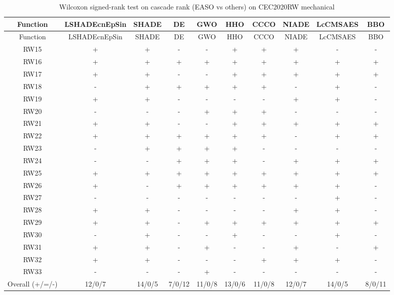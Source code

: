 \begin{center}
\small
\renewcommand{\arraystretch}{1.25}
\begin{longtable}{cccccccccc}
\caption{Wilcoxon signed-rank test on cascade rank (EASO vs others) on CEC2020RW  mechanical}
\label{tab:wilcoxon_cascade_CEC2020RW_mechanical} \\
\toprule
Function & LSHADEcnEpSin & SHADE & DE & GWO & HHO & CCCO & NIADE & LcCMSAES & BBO \\
\midrule
\endfirsthead
\toprule
Function & LSHADEcnEpSin & SHADE & DE & GWO & HHO & CCCO & NIADE & LcCMSAES & BBO \\
\midrule
\endhead
RW15 & + & + & - & - & + & + & + & - & - \\
RW16 & + & + & + & + & + & + & + & + & + \\
RW17 & + & + & - & - & + & + & + & + & + \\
RW18 & - & + & + & + & + & + & - & + & - \\
RW19 & + & + & - & - & - & - & + & + & - \\
RW20 & - & - & - & + & + & + & - & - & - \\
RW21 & + & + & - & - & + & + & + & + & + \\
RW22 & + & + & + & + & + & + & - & + & + \\
RW23 & - & + & + & + & + & - & - & - & - \\
RW24 & - & - & + & + & + & - & + & + & + \\
RW25 & + & + & + & + & + & + & + & + & + \\
RW26 & + & - & + & + & + & + & + & + & - \\
RW27 & - & - & - & - & - & - & - & + & - \\
RW28 & + & + & - & - & - & - & + & + & - \\
RW29 & + & + & - & + & + & + & + & + & + \\
RW30 & - & + & - & - & + & - & - & + & - \\
RW31 & + & + & - & + & - & - & + & - & + \\
RW32 & + & + & - & - & - & + & + & + & - \\
RW33 & - & - & - & + & - & - & - & - & - \\
\midrule
Overall (+/=/-) & 12/0/7 & 14/0/5 & 7/0/12 & 11/0/8 & 13/0/6 & 11/0/8 & 12/0/7 & 14/0/5 & 8/0/11 \\
\bottomrule
\end{longtable}
\end{center}